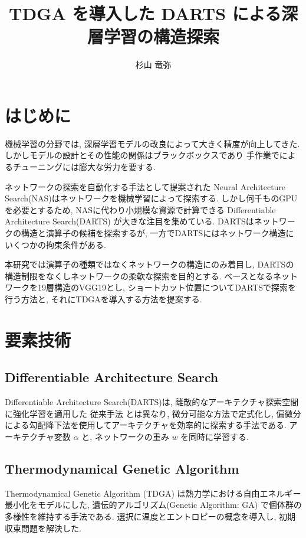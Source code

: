 \documentclass[a4paper,twoside,twocolumn,10pt]{article}
\title{TDGA を導入した DARTS による深層学習の構造探索}
\author{杉山 竜弥}
\begin{document}
\maketitle %
\small

\section{はじめに}
機械学習の分野では, 深層学習モデルの改良によって大きく精度が向上してきた.
しかしモデルの設計とその性能の関係はブラックボックスであり
手作業でによるチューニングには膨大な労力を要する.

ネットワークの探索を自動化する手法として提案された
Neural Architecture Search(NAS)はネットワークを機械学習によって探索する.
しかし何千ものGPUを必要とするため, NASに代わり小規模な資源で計算できる
Differentiable Architecture Search(DARTS) が大きな注目を集めている.
DARTSはネットワークの構造と演算子の候補を探索するが,
一方でDARTSにはネットワーク構造にいくつかの拘束条件がある.

本研究では演算子の種類ではなくネットワークの構造にのみ着目し,
DARTSの構造制限をなくしネットワークの柔軟な探索を目的とする.
ベースとなるネットワークを19層構造のVGG19とし,
ショートカット位置についてDARTSで探索を行う方法と, それにTDGAを導入する方法を提案する.


\section{要素技術}

\subsection{Differentiable Architecture Search}
Differentiable Architecture Search(DARTS)\cite{DBLP:journals/corr/abs-1806-09055}は,
離散的なアーキテクチャ探索空間に強化学習を適用した 従来手法 とは異なり,
微分可能な方法で定式化し,
偏微分による勾配降下法を使用してアーキテクチャを効率的に探索する手法である.
アーキテクチャ変数 $\alpha$ と, ネットワークの重み $w$ を同時に学習する.


\subsection{Thermodynamical Genetic Algorithm}
Thermodynamical Genetic Algorithm (TDGA) は熱力学における自由エネルギー最小化をモデルにした,
遺伝的アルゴリズム(Genetic Algorithm: GA) で個体群の多様性を維持する手法である.
選択に温度とエントロピーの概念を導入し, 初期収束問題を解決した.
\end{document}
